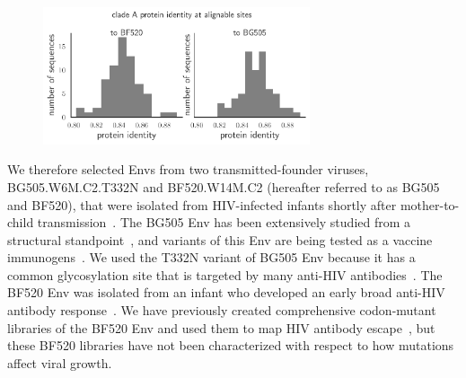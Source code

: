 \documentclass[9pt]{elife}
\begin{document}
\begin{figure}
{}
{\includegraphics[width=0.7\textwidth]{figures/masked_alignment_identity.pdf}}
\end{figure}

We therefore selected Envs from two transmitted-founder viruses, BG505.W6M.C2.T332N and BF520.W14M.C2 (hereafter referred to as BG505 and BF520), that were isolated from HIV-infected infants shortly after mother-to-child transmission~\citep{nduati2000effect,wu2006neutralization,goo2014early}.
The BG505 Env has been extensively studied from a structural standpoint~\citep{julien2013crystal,lyumkis2013cryo,pancera2014structure,huang2014broad,sanders2015hiv,stewart2016trimeric,gristick2016natively}, and variants of this Env are being tested as a vaccine immunogens~\citep{sanders2013next,sanders2015hiv,de2015immunogenicity}.
We used the T332N variant of BG505 Env because it has a common glycosylation site that is targeted by many anti-HIV antibodies~\citep{sanders2013next}.
The BF520 Env was isolated from an infant who developed an early broad anti-HIV antibody response~\citep{goo2014early,simonich2016hiv}.
We have previously created comprehensive codon-mutant libraries of the BF520 Env and used them to map HIV antibody escape~\citep{dingens2017comprehensive}, but these BF520 libraries have not been characterized with respect to how mutations affect viral growth.
\end{document}
